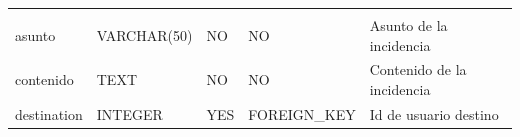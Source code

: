 \documentclass[12pt,a4paperpaper,]{report}
\begin{document}
\begin{longtable}[]{@{}lllll@{}}
\begin{minipage}[t]{0.11\columnwidth}
\end{minipage}\tabularnewline
\begin{minipage}[t]{0.21\columnwidth}\raggedright\strut
asunto\strut
\end{minipage} & \begin{minipage}[t]{0.19\columnwidth}\raggedright\strut
VARCHAR(50)\strut
\end{minipage} & \begin{minipage}[t]{0.16\columnwidth}\raggedright\strut
NO\strut
\end{minipage} & \begin{minipage}[t]{0.19\columnwidth}\raggedright\strut
NO\strut
\end{minipage} & \begin{minipage}[t]{0.11\columnwidth}\raggedright\strut
Asunto de la incidencia\strut
\end{minipage}\tabularnewline
\begin{minipage}[t]{0.21\columnwidth}\raggedright\strut
contenido\strut
\end{minipage} & \begin{minipage}[t]{0.19\columnwidth}\raggedright\strut
TEXT\strut
\end{minipage} & \begin{minipage}[t]{0.16\columnwidth}\raggedright\strut
NO\strut
\end{minipage} & \begin{minipage}[t]{0.19\columnwidth}\raggedright\strut
NO\strut
\end{minipage} & \begin{minipage}[t]{0.11\columnwidth}\raggedright\strut
Contenido de la incidencia\strut
\end{minipage}\tabularnewline
\begin{minipage}[t]{0.21\columnwidth}\raggedright\strut
destination\strut
\end{minipage} & \begin{minipage}[t]{0.19\columnwidth}\raggedright\strut
INTEGER\strut
\end{minipage} & \begin{minipage}[t]{0.16\columnwidth}\raggedright\strut
YES\strut
\end{minipage} & \begin{minipage}[t]{0.19\columnwidth}\raggedright\strut
FOREIGN\_KEY\strut
\end{minipage} & \begin{minipage}[t]{0.11\columnwidth}\raggedright\strut
Id de usuario destino\strut
\end{minipage}\tabularnewline
\bottomrule
\end{longtable}
\end{document}
